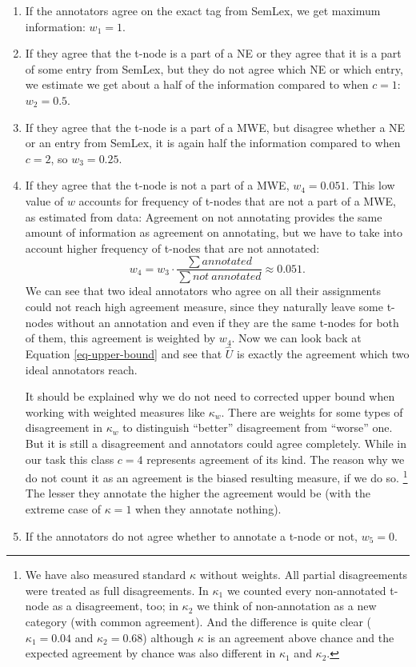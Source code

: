 \begin{enumerate}[$c=1$]
\item
If the annotators agree on the exact tag from SemLex, we get maximum information: $w_1 = 1$.
\item
If they agree that the t-node is a part of a NE or they agree that it is a part of some entry from SemLex, but they do not agree which NE or which entry, we estimate we get about a half of the information compared to when $c=1$: $w_2 = 0.5$.
\item
If they agree that the t-node is a part of a MWE, but disagree whether a NE or an entry from SemLex, it is again half the information compared to when $c=2$, so $w_3 = 0.25$.
\item
If they agree that the t-node is not a part of a MWE, $w_4 = 0.051$. This low value of $w$ accounts for frequency of t-nodes that are not a part of a MWE, as estimated from data: Agreement on not annotating provides the same amount of information as agreement on annotating, but we have to take into account higher frequency of t-nodes that are not annotated: 
  \[  w_4 = w_3 \cdot \frac{\sum annotated}{\sum not\ annotated} \approx 0.051. \]
We can see that two ideal annotators who agree on all their assignments could not reach high agreement measure, since they naturally leave some t-nodes without an annotation and even if they are the same t-nodes for both of them, this agreement is weighted by $w_4$. Now we can look back at Equation \ref{eq-upper-bound} and see that $\widehat{U}$ is exactly the agreement which two ideal annotators reach.

It should be explained why we do not need to corrected upper bound when working with weighted measures like $\kappa_w$.
There are weights for some types of disagreement in $\kappa_w$ to distinguish ``better'' disagreement from ``worse'' one. But it is still a disagreement and annotators could agree completely. While in our task this class $c=4$ represents agreement of its kind. The reason why we do not count it as an agreement is the biased resulting measure, if we do so.%
\footnote{%
We have also measured standard $\kappa$ without weights. All partial disagreements were treated as full disagreements. In $\kappa_1$ we counted every non-annotated t-node as a disagreement, too; in $\kappa_2$ we think of non-annotation as a new category (with common agreement). And the difference is quite clear ($\kappa_1 = 0.04$ and $\kappa_2 = 0.68$) although $\kappa$ is an agreement above chance and the expected agreement by chance was also different in $\kappa_1$ and $\kappa_2$.}
The lesser they annotate the higher the agreement would be (with the extreme case of $\kappa = 1$ when they annotate nothing).
 
\item
If the annotators do not agree whether to annotate a t-node or not, $w_5 = 0$. 
\end{enumerate}

